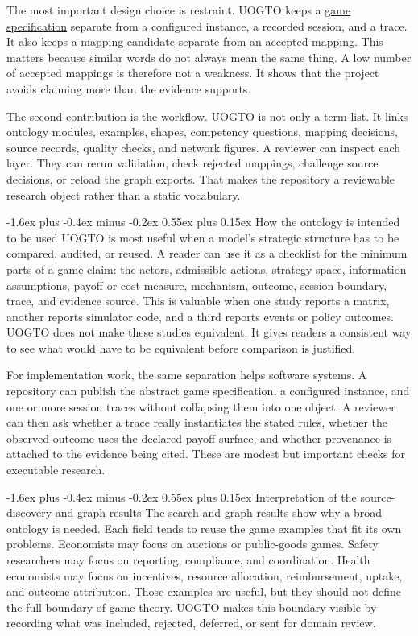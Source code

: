 \documentclass[11pt]{article}
\makeatletter
\renewcommand\subsection{\@startsection{subsection}{2}{\z@}%
  {-1.6ex plus -0.4ex minus -0.2ex}%
  {0.55ex plus 0.15ex}%
  {\normalfont\large\bfseries\color{uogtoInk}}}
\newcommand{\glslink}[2]{\hyperlink{gloss:#1}{#2}}
\makeatother
\begin{document}
The most important design choice is restraint. UOGTO keeps a \glslink{game-specification}{game specification} separate from a configured instance, a recorded session, and a trace. It also keeps a \glslink{mapping-candidate}{mapping candidate} separate from an \glslink{accepted-mapping}{accepted mapping}. This matters because similar words do not always mean the same thing. A low number of accepted mappings is therefore not a weakness. It shows that the project avoids claiming more than the evidence supports.

The second contribution is the workflow. UOGTO is not only a term list. It links ontology modules, examples, shapes, competency questions, mapping decisions, source records, quality checks, and network figures. A reviewer can inspect each layer. They can rerun validation, check rejected mappings, challenge source decisions, or reload the graph exports. That makes the repository a reviewable research object rather than a static vocabulary.

\subsection{How the ontology is intended to be used}
UOGTO is most useful when a model's strategic structure has to be compared, audited, or reused. A reader can use it as a checklist for the minimum parts of a game claim: the actors, admissible actions, strategy space, information assumptions, payoff or cost measure, mechanism, outcome, session boundary, trace, and evidence source. This is valuable when one study reports a matrix, another reports simulator code, and a third reports events or policy outcomes. UOGTO does not make these studies equivalent. It gives readers a consistent way to see what would have to be equivalent before comparison is justified.

For implementation work, the same separation helps software systems. A repository can publish the abstract game specification, a configured instance, and one or more session traces without collapsing them into one object. A reviewer can then ask whether a trace really instantiates the stated rules, whether the observed outcome uses the declared payoff surface, and whether provenance is attached to the evidence being cited. These are modest but important checks for executable research.

\subsection{Interpretation of the source-discovery and graph results}
The search and graph results show why a broad ontology is needed. Each field tends to reuse the game examples that fit its own problems. Economists may focus on auctions or public-goods games. Safety researchers may focus on reporting, compliance, and coordination. Health economists may focus on incentives, resource allocation, reimbursement, uptake, and outcome attribution. Those examples are useful, but they should not define the full boundary of game theory. UOGTO makes this boundary visible by recording what was included, rejected, deferred, or sent for domain review.
\end{document}
